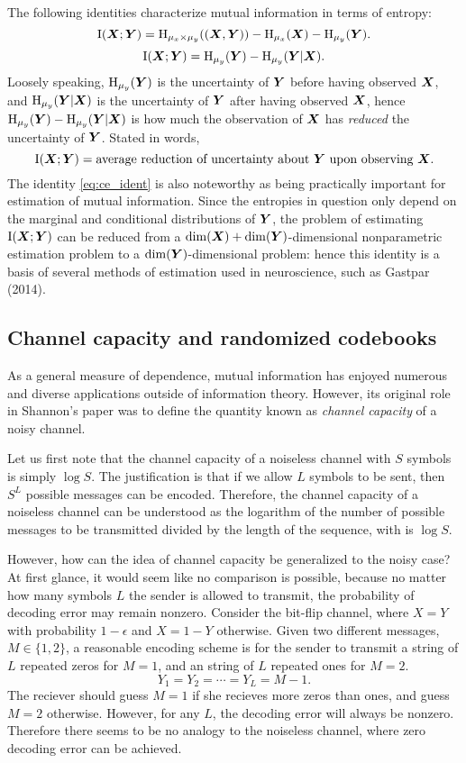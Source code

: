 The following identities characterize mutual information in terms of entropy:
\[
\text{I}(\boldsymbol{X}; \boldsymbol{Y}) = \text{H}_{\mu_x \times \mu_y}((\boldsymbol{X}, \boldsymbol{Y})) - \text{H}_{\mu_x}(\boldsymbol{X}) - \text{H}_{\mu_y}(\boldsymbol{Y}).
\]
\begin{equation}\label{eq:ce_ident}
\text{I}(\boldsymbol{X}; \boldsymbol{Y}) = \text{H}_{\mu_y}(\boldsymbol{Y}) - \text{H}_{\mu_y}(\boldsymbol{Y}|\boldsymbol{X}).
\end{equation}
Loosely speaking, $\text{H}_{\mu_y}(\boldsymbol{Y})$ is the uncertainty of $\boldsymbol{Y}$
before having observed $\boldsymbol{X}$, and $\text{H}_{\mu_y}(\boldsymbol{Y}|\boldsymbol{X})$ is the
uncertainty of $\boldsymbol{Y}$ after having observed $\boldsymbol{X}$, hence
$\text{H}_{\mu_y}(\boldsymbol{Y}) - \text{H}_{\mu_y}(\boldsymbol{Y}|\boldsymbol{X})$ is how much the
observation of $\boldsymbol{X}$ has \emph{reduced} the uncertainty of $\boldsymbol{Y}$.
Stated in words,
\[
\text{I}(\boldsymbol{X}; \boldsymbol{Y}) = \text{average reduction of uncertainty about $\boldsymbol{Y}$ upon observing $\boldsymbol{X}$}.
\]
The identity \eqref{eq:ce_ident} is also noteworthy
as being practically important for estimation of mutual information.
Since the entropies in question only depend on the marginal and
conditional distributions of $\boldsymbol{Y}$, the problem of estimating
$\text{I}(\boldsymbol{X}; \boldsymbol{Y})$ can be reduced from a $\dim(\boldsymbol{X})
+ \dim(\boldsymbol{Y})$-dimensional nonparametric estimation problem to a
$\dim(\boldsymbol{Y})$-dimensional problem: hence this identity is a basis of
several methods of estimation used in neuroscience, such as Gastpar
(2014).


\subsection{Channel capacity and randomized codebooks}

As a general measure of dependence, mutual information has enjoyed
numerous and diverse applications outside of information theory.
However, its original role in Shannon's paper was to define the
quantity known as \emph{channel capacity} of a noisy channel.

Let us first note that the channel capacity of a noiseless channel
with $S$ symbols is simply $\log S$.  The justification is that if we
allow $L$ symbols to be sent, then $S^L$ possible messages can be
encoded.  Therefore, the channel capacity of a noiseless channel can
be understood as the logarithm of the number of possible messages to
be transmitted divided by the length of the sequence, with is $\log
S$.

However, how can the idea of channel capacity be generalized to the
noisy case?  At first glance, it would seem like no comparison is
possible, because no matter how many symbols $L$ the sender is allowed
to transmit, the probability of decoding error may remain nonzero.
Consider the bit-flip channel, where $X = Y$ with probability
$1-\epsilon$ and $X = 1-Y$ otherwise.  Given two different messages,
$M \in \{1,2\}$, a reasonable encoding scheme is for the sender to
transmit a string of $L$ repeated zeros for $M = 1$, and an string of
$L$ repeated ones for $M = 2$.
\[
Y_1 = Y_2 = \cdots = Y_L = M-1.
\]
The reciever should guess $M = 1$ if she recieves more zeros than
ones, and guess $M = 2$ otherwise.  However, for any $L$, the decoding
error will always be nonzero.  Therefore there seems to be no analogy
to the noiseless channel, where zero decoding error can be achieved.

